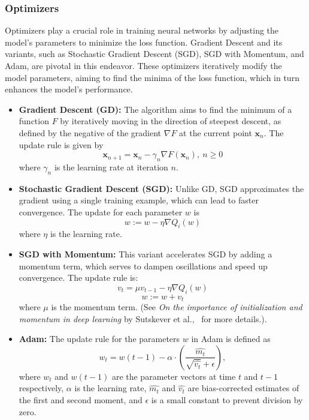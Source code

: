 

\subsubsection*{Optimizers}

Optimizers play a crucial role in training neural networks by adjusting the model's parameters to minimize the loss function. Gradient Descent and its variants, such as Stochastic Gradient Descent (SGD), SGD with Momentum, and Adam, are pivotal in this endeavor. These optimizers iteratively modify the model parameters, aiming to find the minima of the loss function, which in turn enhances the model's performance.

\begin{itemize}
    \item \textbf{Gradient Descent (GD):} The algorithm aims to find the minimum of a function \( F \) by iteratively moving in the direction of steepest descent, as defined by the negative of the gradient \( \nabla F \) at the current point \( \mathbf{x}_n \). The update rule is given by 
    \[ \mathbf {x}_{n+1} = \mathbf {x}_n - \gamma_n \nabla F(\mathbf {x}_n),\ n\geq 0 \]
    where \( \gamma_n \) is the learning rate at iteration \( n \).

    \item \textbf{Stochastic Gradient Descent (SGD):} Unlike GD, SGD approximates the gradient using a single training example, which can lead to faster convergence. The update for each parameter \( w \) is 
    \[ w := w - \eta \nabla Q_i(w) \]
    where \( \eta \) is the learning rate.

    \item \textbf{SGD with Momentum:} This variant accelerates SGD by adding a momentum term, which serves to dampen oscillations and speed up convergence. The update rule is:
    \[ v_t = \mu v_{t-1} - \eta \nabla Q_i(w) \]
    \[ w := w + v_t \]
    where \( \mu \) is the momentum term. (See \textit{On the importance of initialization and momentum in deep learning} by Sutskever et al.,~\cite{sutskever2013importance} for more details.).

    \item \textbf{Adam:} The update rule for the parameters \( w \) in Adam is defined as 
    \[ w_{t} = w(t-1) - \alpha \cdot \left( \frac{\hat{m_t}}{\sqrt{\hat{v_t}} + \epsilon} \right), \]
    where \( w_t \) and \( w(t-1) \) are the parameter vectors at time \( t \) and \( t-1 \) respectively, \( \alpha \) is the learning rate, \( \hat{m_t} \) and \( \hat{v_t} \) are bias-corrected estimates of the first and second moment, and \( \epsilon \) is a small constant to prevent division by zero.
\end{itemize}




